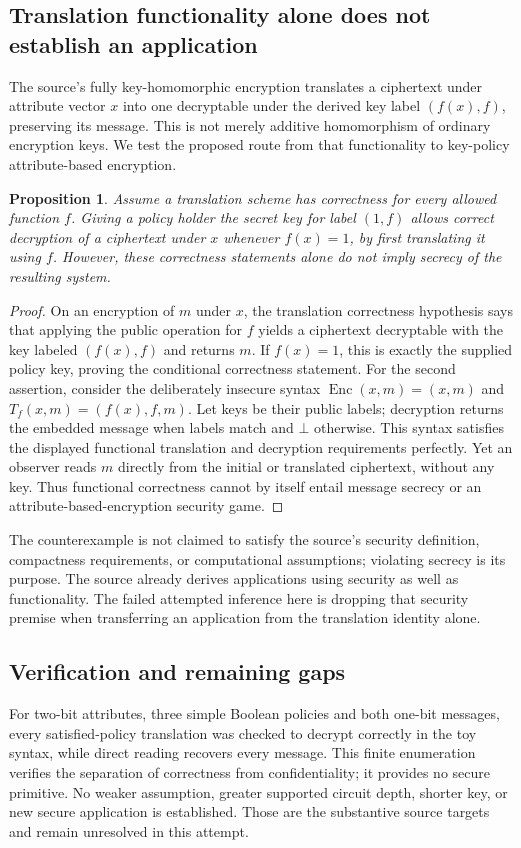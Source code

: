 \documentclass[11pt]{article}
\newtheorem{proposition}{Proposition}
\begin{document}
\subsection{Translation functionality alone does not establish an application}
The source's fully key-homomorphic encryption translates a ciphertext under attribute vector $x$ into one decryptable under the derived key label $(f(x),f)$, preserving its message. This is not merely additive homomorphism of ordinary encryption keys. We test the proposed route from that functionality to key-policy attribute-based encryption.
\begin{proposition}
Assume a translation scheme has correctness for every allowed function $f$. Giving a policy holder the secret key for label $(1,f)$ allows correct decryption of a ciphertext under $x$ whenever $f(x)=1$, by first translating it using $f$. However, these correctness statements alone do not imply secrecy of the resulting system.
\end{proposition}
\begin{proof}
On an encryption of $m$ under $x$, the translation correctness hypothesis says that applying the public operation for $f$ yields a ciphertext decryptable with the key labeled $(f(x),f)$ and returns $m$. If $f(x)=1$, this is exactly the supplied policy key, proving the conditional correctness statement.
For the second assertion, consider the deliberately insecure syntax $\operatorname{Enc}(x,m)=(x,m)$ and $T_f(x,m)=(f(x),f,m)$. Let keys be their public labels; decryption returns the embedded message when labels match and $\bot$ otherwise. This syntax satisfies the displayed functional translation and decryption requirements perfectly. Yet an observer reads $m$ directly from the initial or translated ciphertext, without any key. Thus functional correctness cannot by itself entail message secrecy or an attribute-based-encryption security game.
\end{proof}
The counterexample is not claimed to satisfy the source's security definition, compactness requirements, or computational assumptions; violating secrecy is its purpose. The source already derives applications using security as well as functionality. The failed attempted inference here is dropping that security premise when transferring an application from the translation identity alone.
\subsection{Verification and remaining gaps}
For two-bit attributes, three simple Boolean policies and both one-bit messages, every satisfied-policy translation was checked to decrypt correctly in the toy syntax, while direct reading recovers every message. This finite enumeration verifies the separation of correctness from confidentiality; it provides no secure primitive. No weaker assumption, greater supported circuit depth, shorter key, or new secure application is established. Those are the substantive source targets and remain unresolved in this attempt.
\end{document}

